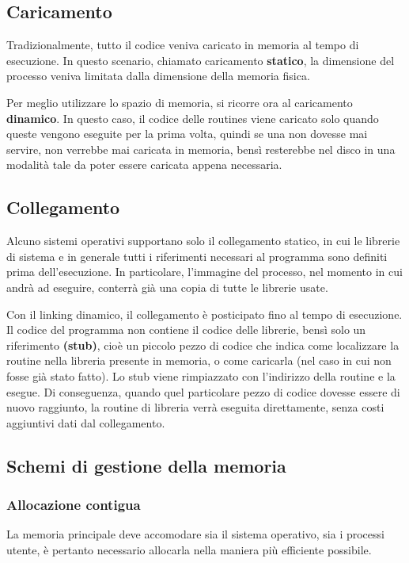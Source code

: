 \documentclass[a4paper]{article}
\begin{document}
\subsection{Caricamento}
Tradizionalmente, tutto il codice veniva caricato in memoria al tempo di esecuzione. In questo scenario, chiamato caricamento \textbf{statico}, la dimensione del processo veniva limitata dalla dimensione della memoria fisica.

Per meglio utilizzare lo spazio di memoria, si ricorre ora al caricamento \textbf{dinamico}. In questo caso, il codice delle routines viene caricato solo quando queste vengono eseguite per la prima volta, quindi se una non dovesse mai servire, non verrebbe mai caricata in memoria, bensì resterebbe nel disco in una modalità tale da poter essere caricata appena necessaria.

\subsection{Collegamento}
Alcuno sistemi operativi supportano solo il collegamento statico, in cui le librerie di sistema e in generale tutti i riferimenti necessari al programma sono definiti prima dell'esecuzione. In particolare, l'immagine del processo, nel momento in cui andrà ad eseguire, conterrà già una copia di tutte le librerie usate.

Con il linking dinamico, il collegamento è posticipato fino al tempo di esecuzione. Il codice del programma non contiene il codice delle librerie, bensì solo un riferimento \textbf{(stub)}, cioè un piccolo pezzo di codice che indica come localizzare la routine nella libreria presente in memoria, o come caricarla (nel caso in cui non fosse già stato fatto). Lo stub viene rimpiazzato con l'indirizzo della routine e la esegue. Di conseguenza, quando quel particolare pezzo di codice dovesse essere di nuovo raggiunto, la routine di libreria verrà eseguita direttamente, senza costi aggiuntivi dati dal collegamento.

\subsection{Schemi di gestione della memoria}

\subsubsection{Allocazione contigua}
La memoria principale deve accomodare sia il sistema operativo, sia i processi utente, è pertanto necessario allocarla nella maniera più efficiente possibile.
\end{document}
